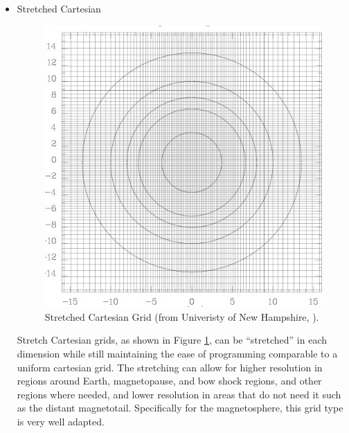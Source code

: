 \begin{itemize}
  \item Stretched Cartesian \\
  \begin{figure}
  	\begin{centering}
  	\includegraphics[scale=0.45]{images/StretchedCartesian.jpg}
  	\caption{Stretched Cartesian Grid (from Univeristy of New Hampshire,
  	\citeyear{StretchCart}).}
  	\label{fig:StretchedCartesian}
  	\end{centering}
  	\figSpace
  \end{figure}
  Stretch Cartesian grids, as shown in Figure \ref{fig:StretchedCartesian}, can
  be ``stretched'' in each dimension while still maintaining the ease of
  programming comparable to a uniform cartesian grid. The stretching can allow
  for higher resolution in regions around Earth, magnetopause, and bow
  shock regions, and other regions where needed, and lower resolution in areas
  that do not need it such as the distant magnetotail. Specifically for the
  magnetosphere, this grid type is very well adapted.
  

\end{itemize}

